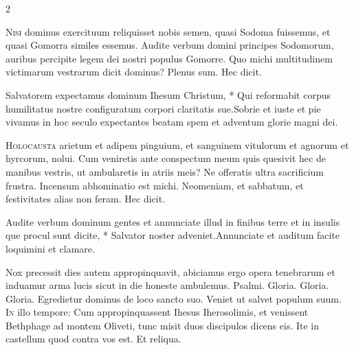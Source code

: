 \begin{multicols*}{2}
\begin{responsory}
\end{responsory}%
\lettrine[lines=2]{\zallmancaps \color{Blue} N}{isi} dominus exercituum reliquisset nobis semen, quasi Sodoma fuissemus, et quasi Gomorra similes essemus. Audite verbum domini principes Sodomorum, auribus percipite legem dei nostri populus Gomorre. Quo michi multitudinem victimarum vestrarum dicit dominus? Plenus sum. Hec dicit.
\begin{responsory}
{Salvatorem expectamus dominum Ihesum Christum, * Qui reformabit corpus humilitatus nostre configuratum corpori claritatis sue.}{Sobrie et iuste et pie vivamus in hoc seculo expectantes beatam spem et adventum glorie magni dei.}
\end{responsory}%
\lettrine[lines=2]{\zallmancaps \color{Red} H}{olocausta} arietum et adipem pinguium, et sanguinem vitulorum et agnorum et hyrcorum, nolui. Cum veniretis ante conspectum meum quis quesivit hec de manibus vestris, ut ambularetis in atriis meis? Ne offeratis ultra sacrificium frustra. Incensum abhominatio est michi. Neomeniam, et sabbatum, et festivitates alias non feram. Hec dicit.
\begin{responsory-doxology}
{Audite verbum dominum gentes et annunciate illud in finibus terre et in insulis que procul sunt dicite, * Salvator noster adveniet.}{Annunciate et auditum facite loquimini et clamare.}
\end{responsory-doxology}%
 Nox precessit dies autem appropinquavit, abiciamus ergo opera tenebrarum et induamur arma lucis sicut in die honeste ambulemus. {\color{Red} Psalmi.}
 Gloria.
 Gloria.
 Gloria. \V Egredietur dominus de loco sancto suo. \R Veniet ut salvet populum suum.
\lettrine[lines=2]{\zallmancaps \color{Blue} I}{n} illo tempore: Cum appropinquassent Ihesus Iherosolimis, et venissent Bethphage ad montem Oliveti, tunc misit duos discipulos dicens eis. Ite in castellum quod contra vos est. Et reliqua.

\end{multicols*}
